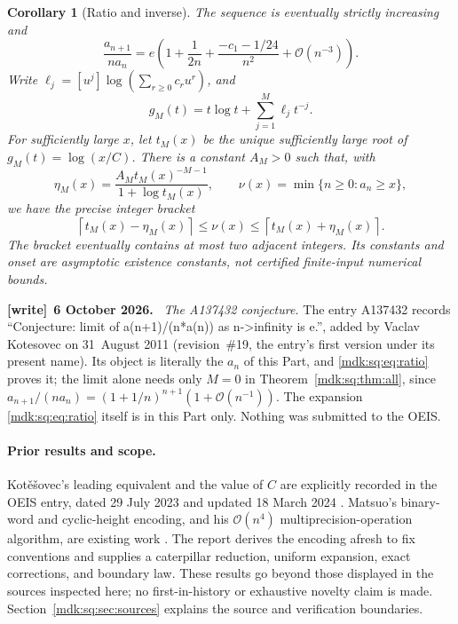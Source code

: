 \documentclass[11pt,letterpaper]{article}
\numberwithin{equation}{section}
\newtheorem{corollary}[theorem]{Corollary}
\theoremstyle{remark}\newtheorem{remark}[theorem]{Remark}
\newcommand{\Oh}{\mathcal O}\newcommand{\Q}{\mathbb Q}\newcommand{\N}{\mathbb N}\newcommand{\R}{\mathbb R}
\newenvironment{writenote}[1][]{\par\smallskip\begingroup\small
 \noindent\textbf{[write]}\if\relax\detokenize{#1}\relax\else~\textbf{#1.}\fi\ }%
 {\par\endgroup\smallskip}
\begin{document}
\begin{corollary}[Ratio and inverse]\label{mdk:sq:cor:inverse}
The sequence is eventually strictly increasing and
\begin{equation}\label{mdk:sq:eq:ratio}
\frac{a_{n+1}}{n a_n}
=e\left(1+\frac1{2n}+\frac{-c_1-1/24}{n^2}+\Oh(n^{-3})\right).
\end{equation}
Write $\ell_j=[u^j]\log(\sum_{r\ge0}c_ru^r)$, and
\[
g_M(t)=t\log t+\sum_{j=1}^M\ell_jt^{-j}.
\]
For sufficiently large $x$, let $t_M(x)$ be the unique sufficiently large root of $g_M(t)=\log(x/C)$. There is a constant $A_M>0$ such that, with
\[
\eta_M(x)=\frac{A_Mt_M(x)^{-M-1}}{1+\log t_M(x)},\qquad
\nu(x)=\min\{n\ge0:a_n\ge x\},
\]
we have the precise integer bracket
\begin{equation}\label{mdk:sq:eq:bracket}
\left\lceil t_M(x)-\eta_M(x)\right\rceil
\le\nu(x)\le
\left\lceil t_M(x)+\eta_M(x)\right\rceil.
\end{equation}
The bracket eventually contains at most two adjacent integers. Its constants and onset are asymptotic existence constants, not certified finite-input numerical bounds.
\end{corollary}
\begin{writenote}[6 October 2026]
\emph{The A137432 conjecture.} The entry A137432 \cite{oeisA137432} records ``Conjecture: limit of a(n+1)/(n*a(n)) as n->infinity is e.'', added by Vaclav Kotesovec on 31~August 2011 (revision~\#19, the entry's first version under its present name). Its object is literally the $a_n$ of this Part, and \eqref{mdk:sq:eq:ratio} proves it; the limit alone needs only $M=0$ in Theorem~\ref{mdk:sq:thm:all}, since $a_{n+1}/(na_n)=(1+1/n)^{n+1}(1+\Oh(n^{-1}))$. The expansion \eqref{mdk:sq:eq:ratio} itself is in this Part only. Nothing was submitted to the OEIS.
\end{writenote}

\paragraph{Prior results and scope.}
Kot\v{e}\v{s}ovec's leading equivalent and the value of $C$ are explicitly recorded in the OEIS entry, dated 29 July 2023 and updated 18 March 2024 \cite{oeisA137432}. Matsuo's binary-word and cyclic-height encoding, and his $\Oh(n^4)$ multiprecision-operation algorithm, are existing work \cite{matsuo}. The report derives the encoding afresh to fix conventions and supplies a caterpillar reduction, uniform expansion, exact corrections, and boundary law. These results go beyond those displayed in the sources inspected here; no first-in-history or exhaustive novelty claim is made. Section~\ref{mdk:sq:sec:sources} explains the source and verification boundaries.
\end{document}
